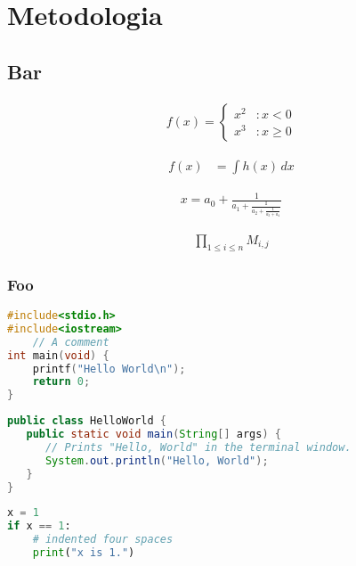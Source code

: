 \documentclass[tcc2]{uftex}
\begin{document}
\lipsum[7] \cite{schmidt03:MSc}

\lipsum[8] \cite{alvisi99:analysisCIC}

\chapter{Metodologia}

\section{Bar}

\lipsum[9] \cite{CORBA:spec}

\begin{eqnarray}
f(x) = \left\{
  \begin{array}{lr}
    x^2 & : x < 0\\
    x^3 & : x \ge 0
  \end{array}
\right.
\end{eqnarray}

\begin{eqnarray}
f(x) & = \int h(x)\, dx
\end{eqnarray}

\begin{eqnarray}
x = a_0 + \frac{1}{a_1 + \frac{1}{a_2 + \frac{1}{a_3 + a_4}}}
\end{eqnarray}

\begin{eqnarray}
\prod_{1\le i \le n}
     M_{i,j}
\end{eqnarray}

\lipsum[10] \cite{gridftp}

\subsection{Foo}

\begin{lstlisting}[language=C]
#include<stdio.h>
#include<iostream>
    // A comment
int main(void) {
    printf("Hello World\n");
    return 0;
}
\end{lstlisting}

\begin{lstlisting}[language=Java]
public class HelloWorld {
   public static void main(String[] args) {
      // Prints "Hello, World" in the terminal window.
      System.out.println("Hello, World");
   }
}
\end{lstlisting}

\begin{lstlisting}[language=Python]
x = 1
if x == 1:
    # indented four spaces
    print("x is 1.")
\end{lstlisting}
\end{document}

